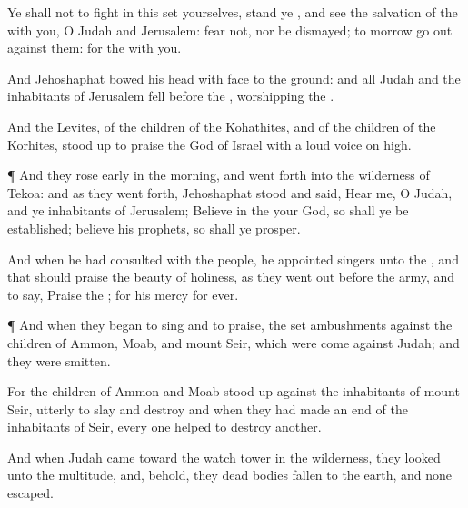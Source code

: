 {Ye shall not
{} to
fight in
this
{}
set yourselves,
stand ye
{}, and
see the
salvation of the
{} with you, O
Judah and
Jerusalem:
fear not, nor be
dismayed; to
morrow go
out
against them: for the
{}
{} with you.

And
Jehoshaphat
bowed his head with
{}
face to the
ground: and all
Judah and the
inhabitants of
Jerusalem
fell
before the
{},
worshipping the
{}.

And the
Levites, of the
children of the
Kohathites, and of the
children of the
Korhites, stood
up to
praise the
{}
God of
Israel with a
loud
voice on
high.


\par }{\PP {}¶ And they rose
early in the
morning, and went
forth into the
wilderness of
Tekoa: and as they went
forth,
Jehoshaphat
stood and
said,
Hear me, O
Judah, and ye
inhabitants of
Jerusalem;
Believe in the
{} your
God, so shall ye be
established;
believe his
prophets, so shall ye
prosper.

And when he had
consulted with the
people, he
appointed
singers unto the
{}, and that should
praise the
beauty of
holiness, as they went
out
before the
army, and to
say,
Praise the
{}; for his
mercy
{} for
ever.


\par }{\PP {}¶ And
when they
began to
sing and to
praise, the
{}
set
ambushments against the
children of
Ammon,
Moab, and
mount
Seir, which were
come against
Judah; and they were
smitten.

For the
children of
Ammon and
Moab stood
up against the
inhabitants of
mount
Seir, utterly to
slay and
destroy
{} and when they had made an
end of the
inhabitants of
Seir, every
one
helped to
destroy
another.

And when
Judah
came toward the watch
tower in the
wilderness, they
looked unto the
multitude, and, behold, they
{} dead
bodies
fallen to the
earth, and none
escaped.

}

